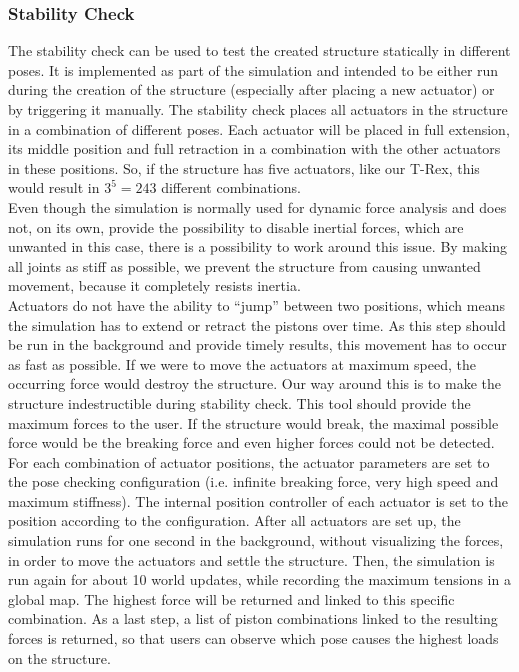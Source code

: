 \subsubsection{Stability Check}
The stability check can be used to test the created structure statically in different poses. It is implemented as part of the simulation and intended to be either run during the creation of the structure (especially after placing a new actuator) or by triggering it manually. The stability check places all actuators in the structure in a combination of different poses. Each actuator will be placed in full extension, its middle position and full retraction in a combination with the other actuators in these positions. So, if the structure has five actuators, like our T-Rex, this would result in $3 ^ 5 = 243$ different combinations.\\
Even though the simulation is normally used for dynamic force analysis and does not, on its own, provide the possibility to disable inertial forces, which are unwanted in this case, there is a possibility to work around this issue. By making all joints as stiff as possible, we prevent the structure from causing unwanted movement, because it completely resists inertia.\\
Actuators do not have the ability to ``jump'' between two positions, which means the simulation has to extend or retract the pistons over time. As this step should be run in the background and provide timely results, this movement has to occur as fast as possible. If we were to move the actuators at maximum speed, the occurring force would destroy the structure. Our way around this is to make the structure indestructible during stability check. This tool should provide the maximum forces to the user. If the structure would break, the maximal possible force would be the breaking force and even higher forces could not be detected.\\
For each combination of actuator positions, the actuator parameters are set to the pose checking configuration (i.e. infinite breaking force, very high speed and maximum stiffness). The internal position controller of each actuator is set to the position according to the configuration. After all actuators are set up, the simulation runs for one second in the background, without visualizing the forces, in order to move the actuators and settle the structure. Then, the simulation is run again for about 10 world updates, while recording the maximum tensions in a global map. The highest force will be returned and linked to this specific combination. As a last step, a list of piston combinations linked to the resulting forces is returned, so that users can observe which pose causes the highest loads on the structure.

